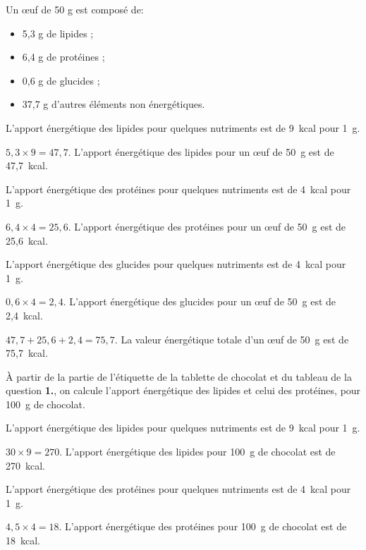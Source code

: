 \begin{enumerate}
\item Un \oe uf de 50 g est composé de:
\begin{itemize}
\item 5,3 g de lipides ; 
\item 6,4 g de protéines ; 
\item 0,6 g de glucides ; 
\item 37,7 g d'autres éléments non énergétiques. 
\end{itemize}
L'apport énergétique des lipides pour quelques nutriments est de 9~kcal pour 1~g. 

$5,3 \times 9=47,7$. L'apport énergétique des lipides pour un œuf de 50~g est de 47,7~kcal.

L'apport énergétique des protéines pour quelques nutriments est de 4~kcal pour 1~g.

$6,4 \times 4=25,6$. L'apport énergétique des protéines pour un œuf de 50~g est de 25,6~kcal.

L'apport énergétique des glucides pour quelques nutriments est de 4~kcal pour 1~g.

$0,6 \times 4 = 2,4$. L'apport énergétique des glucides pour un œuf de 50~g est de 2,4~kcal. 

$47,7+25,6+2,4=75,7$. La valeur énergétique totale d'un œuf de 50~g est de 75,7~kcal. 

\begin{minipage}{9cm}
\item À partir de la partie de l'étiquette de la tablette de chocolat et du tableau de la question \textbf{1.}, on calcule l'apport énergétique des lipides et celui des protéines, pour 100~g de chocolat.

L'apport énergétique des lipides pour quelques nutriments est de 9~kcal pour 1~g.

$30 \times 9  = 270$. L'apport énergétique des lipides pour 100~g de chocolat est de 270~kcal.

L'apport énergétique des protéines pour quelques nutriments est de 4~kcal pour 1~g.

$4,5 \times 4 = 18$. L'apport énergétique des protéines pour 100~g de chocolat est de 18~kcal.


\end{minipage}
\end{enumerate}

